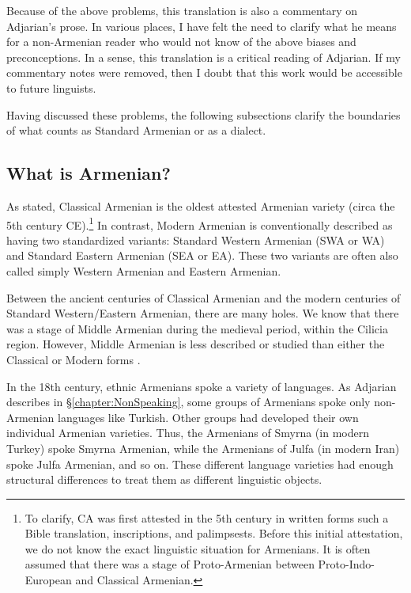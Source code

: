 \documentclass[output=paper]{langscibook}
\begin{document}
Because of the above problems, this translation is also a commentary on Adjarian's prose. In various places, I have felt the need to clarify what he means for a non\hyp Armenian reader who would not know of the above biases and preconceptions. In a sense, this translation is a critical reading of Adjarian. If my commentary notes were removed, then I doubt that this work would be accessible to future linguists.


Having discussed these problems, the following subsections clarify the boundaries of what counts as Standard Armenian or as a dialect. 

\subsection{What is Armenian?}\label{sec:HossepIntro:armenian:whatisarm}

As stated, Classical Armenian is the oldest attested Armenian variety (circa the 5th century CE).\footnote{To clarify, CA was first attested in the 5th century in written forms such a Bible translation, inscriptions, and palimpsests. Before this initial attestation, we do not know the exact linguistic situation for Armenians. It is often assumed that there was a stage of Proto-Armenian between Proto-Indo-European and Classical Armenian.} In contrast, Modern Armenian is conventionally described as having two standardized variants: Standard Western Armenian (SWA or WA) and Standard Eastern Armenian (SEA or EA). These two variants are often also called simply Western Armenian and Eastern Armenian. 

Between the ancient centuries of Classical Armenian and the modern centuries of Standard Western/Eastern Armenian, there are many holes. We know that there was a stage of Middle Armenian during the medieval period, within the Cilicia region. However, Middle Armenian is less described or studied than either the Classical or Modern forms \citep{Karst-1901-MiddleArmenain}. 

In the 18th century, ethnic Armenians spoke a variety of languages. As Adjarian describes in \S\ref{chapter:NonSpeaking}, some groups of Armenians spoke only non\hyp Armenian languages like Turkish. Other groups had developed their own individual Armenian varieties. Thus, the Armenians of Smyrna (in modern Turkey) spoke Smyrna Armenian, while the Armenians of Julfa (in modern Iran) spoke Julfa Armenian, and so on. These different language varieties had enough structural differences to treat them as different linguistic objects. 
\end{document}
